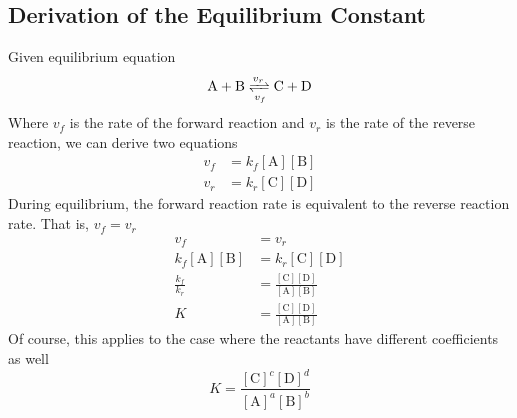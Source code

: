 \subsection{Derivation of the Equilibrium Constant}
Given equilibrium equation
\[
    \mathrm{A+B} \xrightleftharpoons[v_f]{v_r} \mathrm{C+D}
\]
Where $v_f$ is the rate of the forward reaction and $v_r$ is the rate of the reverse reaction,
we can derive two equations
\begin{align*}
    v_f&=k_f[\mathrm{A}][\mathrm{B}]\\
    v_r&=k_r[\mathrm{C}][\mathrm{D}]
\end{align*}
During equilibrium, the forward reaction rate is equivalent to the reverse reaction rate. That is,
$v_f=v_r$
\begin{align*}
    v_f&=v_r\\
    k_f[\mathrm{A}][\mathrm{B}]&=k_r[\mathrm{C}][\mathrm{D}]\\
    \frac{k_f}{k_r}&=\frac{[\mathrm{C}][\mathrm{D}]}{[\mathrm{A}][\mathrm{B}]}\\
    K&=\frac{[\mathrm{C}][\mathrm{D}]}{[\mathrm{A}][\mathrm{B}]}
\end{align*}
Of course, this applies to the case where the reactants have different coefficients as well
\[
    K=\frac{[\mathrm{C}]^c[\mathrm{D}]^d}{[\mathrm{A}]^a[\mathrm{B}]^b}
\]
